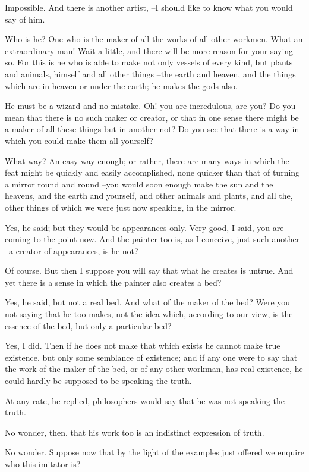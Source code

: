 Impossible.
And there is another artist, --I should like to know what you would say of him.

Who is he?
One who is the maker of all the works of all other workmen.
What an extraordinary man!
Wait a little, and there will be more reason for your saying so. For this is he who is able to make not only vessels of every kind, but plants and animals, himself and all other things --the earth and heaven, and the things which are in heaven or under the earth; he makes the gods also.

He must be a wizard and no mistake.
Oh! you are incredulous, are you? Do you mean that there is no such maker or creator, or that in one sense there might be a maker of all these things but in another not? Do you see that there is a way in which you could make them all yourself?

What way?
An easy way enough; or rather, there are many ways in which the feat might be quickly and easily accomplished, none quicker than that of turning a mirror round and round --you would soon enough make the sun and the heavens, and the earth and yourself, and other animals and plants, and all the, other things of which we were just now speaking, in the mirror.

Yes, he said; but they would be appearances only.
Very good, I said, you are coming to the point now. And the painter too is, as I conceive, just such another --a creator of appearances, is he not?

Of course.
But then I suppose you will say that what he creates is untrue. And yet there is a sense in which the painter also creates a bed?

Yes, he said, but not a real bed.
And what of the maker of the bed? Were you not saying that he too makes, not the idea which, according to our view, is the essence of the bed, but only a particular bed?

Yes, I did.
Then if he does not make that which exists he cannot make true existence, but only some semblance of existence; and if any one were to say that the work of the maker of the bed, or of any other workman, has real existence, he could hardly be supposed to be speaking the truth.

At any rate, he replied, philosophers would say that he was not speaking the truth.

No wonder, then, that his work too is an indistinct expression of truth.

No wonder.
Suppose now that by the light of the examples just offered we enquire who this imitator is?

